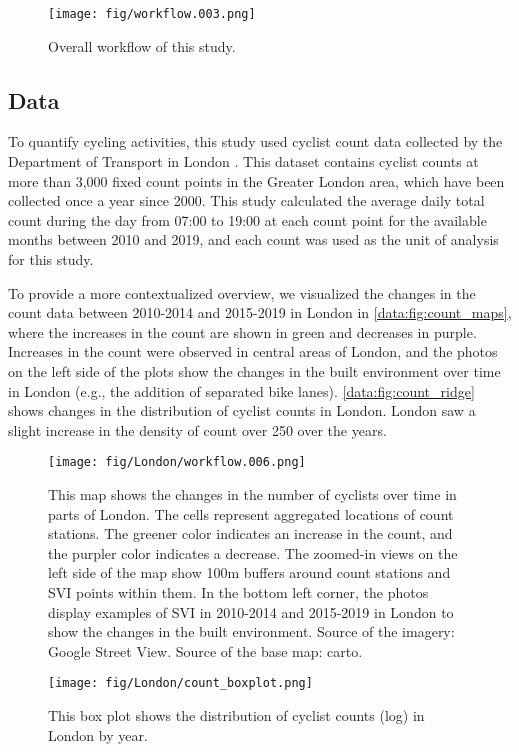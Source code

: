 \documentclass[preprint,12pt, authoryear]{elsarticle}
\begin{document}
\begin{figure}
    \centering
    \texttt{[image: fig/workflow.003.png]}
    \caption{Overall workflow of this study.}
    \label{methodology:fig:workflow}
\end{figure}

\subsection{Data}
To quantify cycling activities, this study used cyclist count data collected by the Department of Transport in London \citep{DfT2022}. This dataset contains cyclist counts at more than 3,000 fixed count points in the Greater London area, which have been collected once a year since 2000. This study calculated the average daily total count during the day from 07:00 to 19:00 at each count point for the available months between 2010 and 2019, and each count was used as the unit of analysis for this study.

To provide a more contextualized overview, we visualized the changes in the count data between 2010-2014 and 2015-2019 in London in \autoref{data:fig:count_maps}, where the increases in the count are shown in green and decreases in purple. Increases in the count were observed in central areas of London, and the photos on the left side of the plots show the changes in the built environment over time in London (e.g., the addition of separated bike lanes).
\autoref{data:fig:count_ridge} shows changes in the distribution of cyclist counts in London.
London saw a slight increase in the density of count over 250 over the years.

\begin{figure}
    \centering
    \texttt{[image: fig/London/workflow.006.png]}
    \caption{This map shows the changes in the number of cyclists over time in parts of London. The cells represent aggregated locations of count stations. The greener color indicates an increase in the count, and the purpler color indicates a decrease. The zoomed-in views on the left side of the map show 100m buffers around count stations and SVI points within them. In the bottom left corner, the photos display examples of SVI in 2010-2014 and 2015-2019 in London to show the changes in the built environment. Source of the imagery: Google Street View. Source of the base map: carto.}
    \label{data:fig:count_maps}
\end{figure}

\begin{figure}
    \centering
    \texttt{[image: fig/London/count\_boxplot.png]}
    \caption{This box plot shows the distribution of cyclist counts (log) in London by year.}
    \label{data:fig:count_ridge}
\end{figure}
\end{document}
